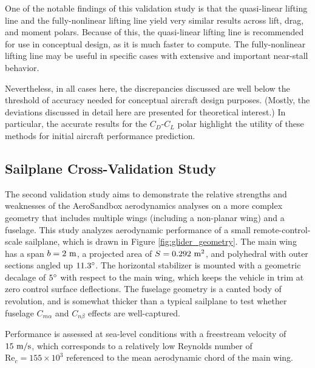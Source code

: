 One of the notable findings of this validation study is that the quasi-linear lifting line and the fully-nonlinear lifting line yield very similar results across lift, drag, and moment polars. Because of this, the quasi-linear lifting line is recommended for use in conceptual design, as it is much faster to compute. The fully-nonlinear lifting line may be useful in specific cases with extensive and important near-stall behavior.

Nevertheless, in all cases here, the discrepancies discussed are well below the threshold of accuracy needed for conceptual aircraft design purposes. (Mostly, the deviations discussed in detail here are presented for theoretical interest.) In particular, the accurate results for the $C_D$-$C_L$ polar highlight the utility of these methods for initial aircraft performance prediction.

\subsection{Sailplane Cross-Validation Study}

The second validation study aims to demonstrate the relative strengths and weaknesses of the AeroSandbox aerodynamics analyses on a more complex geometry that includes multiple wings (including a non-planar wing) and a fuselage. This study analyzes aerodynamic performance of a small remote-control-scale sailplane, which is drawn in Figure \ref{fig:glider_geometry}. The main wing has a span $b = 2\ \rm m$, a projected area of $S=0.292\ \rm m^2$, and polyhedral with outer sections angled up $11.3\degree$. The horizontal stabilizer is mounted with a geometric decalage of $5\degree$ with respect to the main wing, which keeps the vehicle in trim at zero control surface deflections. The fuselage geometry is a canted body of revolution, and is somewhat thicker than a typical sailplane to test whether fuselage $C_{m\alpha}$ and $C_{n\beta}$ effects are well-captured.

Performance is assessed at sea-level conditions with a freestream velocity of $15\ \rm m/s$, which corresponds to a relatively low Reynolds number of $\text{Re}_c = 155 \times 10^3$ referenced to the mean aerodynamic chord of the main wing.

